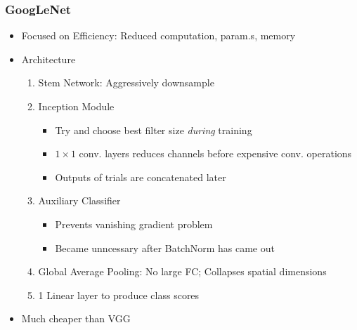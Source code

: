 \subsubsection*{GoogLeNet}
\begin{itemize}
    \item Focused on Efficiency: Reduced computation, param.s, memory
    \item Architecture
    \begin{enumerate}
        \item Stem Network: Aggressively downsample
        \item Inception Module
        \begin{itemize}
            \item Try and choose best filter size \textit{during} training
            \item $1\times1$ conv. layers reduces channels before expensive conv. operations
            \item Outputs of trials are concatenated later
        \end{itemize}
        \item Auxiliary Classifier
        \begin{itemize}
            \item Prevents vanishing gradient problem
            \item Became unncessary after BatchNorm has came out
        \end{itemize}
        \item Global Average Pooling: No large FC; Collapses spatial dimensions
        \item 1 Linear layer to produce class scores
    \end{enumerate}
    \item Much cheaper than VGG
\end{itemize}
\begin{figures}
\end{figures}

